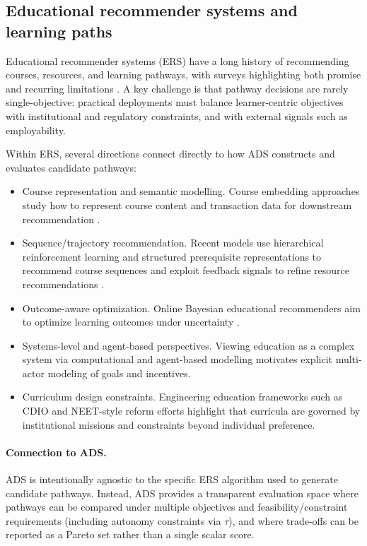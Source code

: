 \documentclass{article}
\begin{document}
\subsection{Educational recommender systems and learning paths}
\label{sec:rw-ers}

Educational recommender systems (ERS) have a long history of recommending courses, resources, and learning pathways, with surveys highlighting both promise and recurring limitations \cite{shi2020,dasilva2022slrERS,aucancela2023ersslr}.
A key challenge is that pathway decisions are rarely single-objective: practical deployments must balance learner-centric objectives with institutional and regulatory constraints, and with external signals such as employability.

Within ERS, several directions connect directly to how ADS constructs and evaluates candidate pathways:
\begin{itemize}
    \item {Course representation and semantic modelling.} Course embedding approaches study how to represent course content and transaction data for downstream recommendation \cite{jiang2020multifactorCourse2vec,xu2023courseEmbeddings}.
    \item {Sequence/trajectory recommendation.} Recent models use hierarchical reinforcement learning and structured prerequisite representations to recommend course sequences \cite{hhcor2024} and exploit feedback signals to refine resource recommendations \cite{dfrp2024}.
    \item {Outcome-aware optimization.} Online Bayesian educational recommenders aim to optimize learning outcomes under uncertainty \cite{ober2025}.
    \item {Systems-level and agent-based perspectives.} Viewing education as a complex system via computational and agent-based modelling \cite{vulic2024complexEdu,reardon2016abm-education} motivates explicit multi-actor modeling of goals and incentives.
    \item {Curriculum design constraints.} Engineering education frameworks such as CDIO \cite{crawley2011cdio} and NEET-style reform efforts \cite{crawley2018neet} highlight that curricula are governed by institutional missions and constraints beyond individual preference.
\end{itemize}

\paragraph{Connection to ADS.}
ADS is intentionally agnostic to the specific ERS algorithm used to generate candidate pathways.
Instead, ADS provides a transparent evaluation space where pathways can be compared under multiple objectives and feasibility/constraint requirements (including autonomy constraints via $\tau$), and where trade-offs can be reported as a Pareto set rather than a single scalar score.
\end{document}
